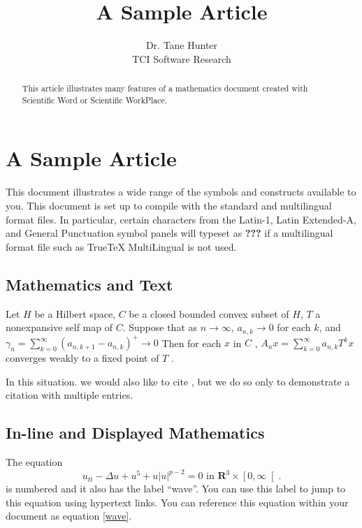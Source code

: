 \documentclass{article}
\begin{document}
\title{A Sample Article}
\author{Dr. Tane Hunter \\
TCI Software Research}
\maketitle

\begin{abstract}
This article illustrates many features of a mathematics document created
with Scientific Word or Scientific WorkPlace.
\end{abstract}

\tableofcontents
\listoffigures

\section{A Sample Article}

This document illustrates a wide range of the symbols and constructs
available to you. This document is set up to compile with the standard and
multilingual format files. In particular, certain characters from the
Latin-1, Latin Extended-A, and General Punctuation symbol panels will
typeset as \textbf{???} if a multilingual format file such as TrueTeX
MultiLingual is not used.

\subsection{Mathematics and Text}

Let $H$ be a Hilbert space, $C$ be a closed bounded convex subset of $H$, $T$
a nonexpansive self map of $C$. Suppose that as $n\rightarrow \infty $, $%
a_{n,k}\rightarrow 0$ for each $k$, and $\gamma _{n}=\sum_{k=0}^{\infty
}\left( a_{n,k+1}-a_{n,k}\right) ^{+}\rightarrow 0$ Then for each $x$ in $C$%
, $A_{n}x=\sum_{k=0}^{\infty }a_{n,k}T^{k}x$ converges weakly to a fixed
point of $T$ \cite{dunford}.

In this situation. we would also like to cite \cite%
{black,blyth,Chang,condorcet,funkenbusch}, but we do so only to demonstrate
a citation with multiple entries.

\subsection{In-line and Displayed Mathematics}

The equation 
\begin{equation}
u_{tt}-\Delta u+u^{5}+u\left| u\right| ^{p-2}=0\text{ in }\mathbf{R}%
^{3}\times \left[ 0,\infty \right[ .  \tag{1}  \label{wave}
\end{equation}
is numbered and it also has the label ``wave''. You can use this label to
jump to this equation using hypertext links. You can reference this equation
within your document as equation \ref{wave}.
\end{document}
